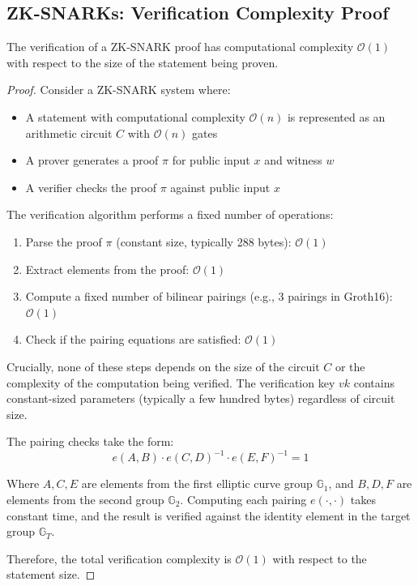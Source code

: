 \documentclass[12pt]{article}
\begin{document}
\subsection{ZK-SNARKs: Verification Complexity Proof}

\begin{theorem}
The verification of a ZK-SNARK proof has computational complexity $\mathcal{O}(1)$ with respect to the size of the statement being proven.
\end{theorem}

\begin{proof}
Consider a ZK-SNARK system where:
\begin{itemize}
\item A statement with computational complexity $\mathcal{O}(n)$ is represented as an arithmetic circuit $C$ with $\mathcal{O}(n)$ gates
\item A prover generates a proof $\pi$ for public input $x$ and witness $w$
\item A verifier checks the proof $\pi$ against public input $x$
\end{itemize}

The verification algorithm performs a fixed number of operations:
\begin{enumerate}
\item Parse the proof $\pi$ (constant size, typically 288 bytes): $\mathcal{O}(1)$
\item Extract elements from the proof: $\mathcal{O}(1)$
\item Compute a fixed number of bilinear pairings (e.g., 3 pairings in Groth16): $\mathcal{O}(1)$
\item Check if the pairing equations are satisfied: $\mathcal{O}(1)$
\end{enumerate}

Crucially, none of these steps depends on the size of the circuit $C$ or the complexity of the computation being verified. The verification key $vk$ contains constant-sized parameters (typically a few hundred bytes) regardless of circuit size.

The pairing checks take the form:
\begin{equation}
e(A, B) \cdot e(C, D)^{-1} \cdot e(E, F)^{-1} = 1
\end{equation}

Where $A, C, E$ are elements from the first elliptic curve group $\mathbb{G}_1$, and $B, D, F$ are elements from the second group $\mathbb{G}_2$. Computing each pairing $e(\cdot, \cdot)$ takes constant time, and the result is verified against the identity element in the target group $\mathbb{G}_T$.

Therefore, the total verification complexity is $\mathcal{O}(1)$ with respect to the statement size.
\end{proof}
\end{document}
